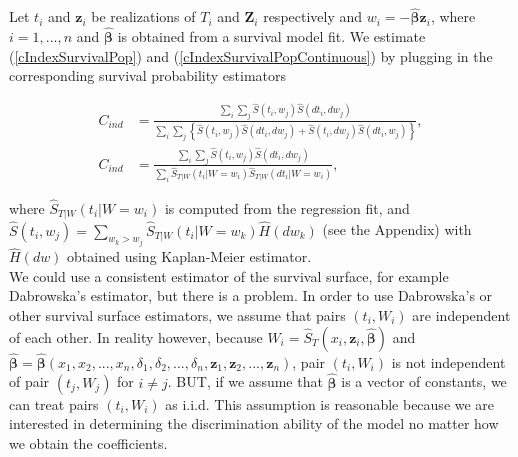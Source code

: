 \documentclass[]{article}\usepackage[]{graphicx}\usepackage[]{color}
\begin{document}
Let $t_i$ and $\pmb{z}_i$ be realizations of $T_i$ and $\pmb{Z}_i$ respectively and $w_i = -\widehat{\pmb{\beta}}\pmb{z}_i$, where $i = 1,...,n$ and $\widehat{\pmb{\beta}}$ is obtained from a survival model fit.
We estimate (\ref{cIndexSurvivalPop}) and (\ref{cIndexSurvivalPopContinuous}) by plugging in the corresponding survival probability estimators
\begin{linenomath}
\begin{align}
  \label{cIndetSurvivalSample}
    \widehat{C_{ind}} &= \frac{ \sum_i \sum_j \widehat{S}(t_i, w_j)\widehat{S}(dt_i,dw_j)}{\sum_i \sum_j \left\{\widehat{S}(t_i, w_j)\widehat{S}(dt_i,dw_j) +  \widehat{S}(t_i, dw_j)\widehat{S}(dt_i,w_j)\right\} },\\
    \label{cIndetSurvivalSampleContinuous}
    \widehat{C_{ind}} &= \frac{ \sum_i \sum_j \widehat{S}(t_i, w_j)\widehat{S}(dt_i,dw_j)}{\sum_i \widehat{S}_{T|W}(t_i|W=w_i) \widehat{S}_{T|W}(dt_i|W=w_i)},
\end{align}
\end{linenomath}
where $\widehat{S}_{T|W}(t_i|W=w_i)$ is computed from the regression fit, and  $\widehat{S}(t_i, w_j) = \sum_{w_k > w_j} \widehat{S}_{T|W}(t_i | W=w_k) \widehat{H}(dw_k) $ (see the Appendix) with $\widehat{H}(dw)$ obtained using Kaplan-Meier estimator.\\


We could use a consistent estimator of the survival surface, for example Dabrowska's estimator, but there is a problem. In order to use Dabrowska's or other survival surface estimators, we assume that pairs $(t_i,W_i)$ are independent of each other. In reality however, because $W_{i} = \widehat{S}_T(x_i,\pmb{z}_{i}, \widehat{\pmb{\beta}})$ and $\widehat{\pmb{\beta}} = \widehat{\pmb{\beta}}(x_1, x_2, ... , x_n, \delta_1, \delta_2,... , \delta_n, \pmb{z}_1,\pmb{z}_2,...,\pmb{z}_n)$, pair $(t_i, W_i)$ is not independent of pair $(t_j, W_j)$ for $i\neq j$. BUT, if we assume that $\widehat{\pmb{\beta}}$ is a vector of constants, we can treat pairs $(t_i, W_i)$ as i.i.d. This assumption is reasonable because we are interested in determining the discrimination ability of the model no matter how we obtain the coefficients.\\

\end{document}
